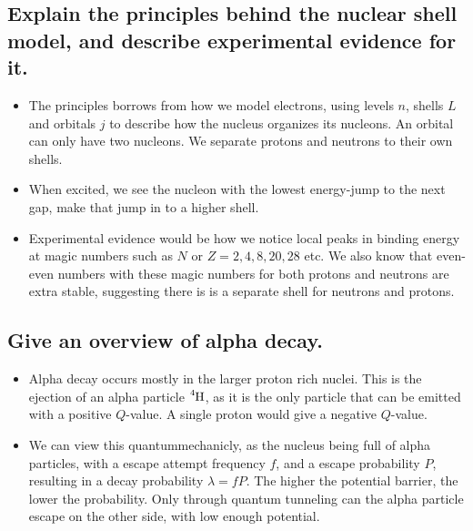 \documentclass{article}
\begin{document}
\subsection{Explain the principles behind the nuclear shell model, and describe experimental evidence for it.}
\begin{itemize}
    \item The principles borrows from how we model electrons, using levels $n$, shells $L$ and orbitals $j$ to describe how the nucleus organizes its nucleons. An orbital can only have two nucleons. We separate protons and neutrons to their own shells. 
    \item When excited, we see the nucleon with the lowest energy-jump to the next gap, make that jump in to a higher shell. 
    \item Experimental evidence would be how we notice local peaks in binding energy at magic numbers such as $N$ or $Z = 2, 4, 8, 20, 28$ etc. We also know that even-even numbers with these magic numbers for both protons and neutrons are extra stable, suggesting there is is a separate shell for neutrons and protons.  
\end{itemize}




\subsection{Give an overview of alpha decay.}
\begin{itemize}
    \item Alpha decay occurs mostly in the larger proton rich nuclei. This is the ejection of an alpha particle $\ce{_{}^{4}\text{H}_{}}$, as it is the only particle that can be emitted with a positive $Q$-value. A single proton would give a negative $Q$-value.
    \item We can view this quantummechanicly, as the nucleus being full of alpha particles, with a escape attempt frequency $f$, and a escape probability $P$, resulting in a decay probability $λ = fP$. The higher the potential barrier, the lower the probability. Only through quantum tunneling can the alpha particle escape on the other side, with low enough potential. 
\end{itemize}
\end{document}
